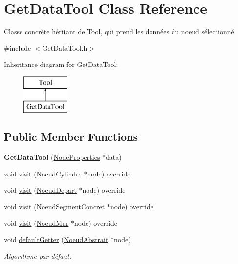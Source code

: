 \hypertarget{class_get_data_tool}{}\section{Get\+Data\+Tool Class Reference}
\label{class_get_data_tool}


Classe concrète héritant de \hyperlink{class_tool}{Tool}, qui prend les données du noeud sélectionné  




{\ttfamily \#include $<$Get\+Data\+Tool.\+h$>$}

Inheritance diagram for Get\+Data\+Tool\+:\begin{figure}[H]
\begin{center}
\leavevmode
\includegraphics[height=2.000000cm]{class_get_data_tool}
\end{center}
\end{figure}
\subsection*{Public Member Functions}
\begin{DoxyCompactItemize}
\item 
\hypertarget{class_get_data_tool_a9812d5218ecf28b18dbd8ae8180e98f6}{}{\bfseries Get\+Data\+Tool} (\hyperlink{struct_node_properties}{Node\+Properties} $\ast$data)\label{class_get_data_tool_a9812d5218ecf28b18dbd8ae8180e98f6}

\item 
void \hyperlink{group__inf2990_ga21292ea905abc9e5c85d04e4ca9b6863}{visit} (\hyperlink{class_noeud_cylindre}{Noeud\+Cylindre} $\ast$node) override
\item 
void \hyperlink{group__inf2990_ga4ce08dbc70076e50ec519cd082a9e1ad}{visit} (\hyperlink{class_noeud_depart}{Noeud\+Depart} $\ast$node) override
\item 
void \hyperlink{group__inf2990_gae3edeae69aab08455d88459437c1c941}{visit} (\hyperlink{class_noeud_segment_concret}{Noeud\+Segment\+Concret} $\ast$node) override
\item 
void \hyperlink{group__inf2990_ga9db0192f32035edd1e4b8c2858feb5d1}{visit} (\hyperlink{class_noeud_mur}{Noeud\+Mur} $\ast$node) override
\item 
void \hyperlink{group__inf2990_gab96d72787632de185fd46dee5d8b9750}{default\+Getter} (\hyperlink{class_noeud_abstrait}{Noeud\+Abstrait} $\ast$node)
\begin{DoxyCompactList}\small\item\em Algorithme par défaut. \end{DoxyCompactList}\end{DoxyCompactItemize}


